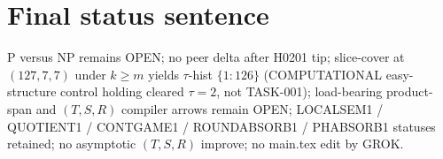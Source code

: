 \documentclass[11pt]{article}
\begin{document}
\section*{Final status sentence}
P versus NP remains OPEN; no peer delta after H0201 tip; slice-cover at $(127,7,7)$ under
$k{\ge}m$ yields $\tau$-hist $\{1{:}126\}$ (COMPUTATIONAL easy-structure control holding
cleared $\tau{=}2$, not TASK-001); load-bearing product-span and $(T,S,R)$ compiler arrows
remain OPEN; LOCALSEM1 / QUOTIENT1 / CONTGAME1 / ROUNDABSORB1 / PHABSORB1 statuses retained;
no asymptotic $(T,S,R)$ improve; no main.tex edit by GROK.
\end{document}
